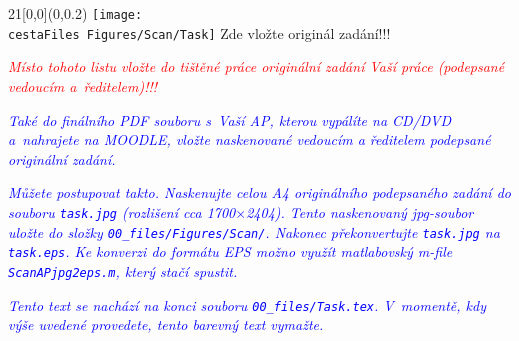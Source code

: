 ﻿\begin{textblock}{21}[0,0](0,0.2)
    \ifnum {}
        \texttt{[image: \\cestaFiles Figures/Scan/Task]}
    \else
        \vglue 13cm
        \hspace{5cm}
        {\huge Zde vložte originál zadání!!!}
    \fi
\end{textblock}

\textcolor{red}{\em Místo tohoto listu vložte do tištěné práce originální zadání Vaší práce (podepsané vedoucím a~ře\-di\-te\-lem)!!!\/}

\textcolor{blue}{\em Také do finálního PDF souboru s~Vaší AP, kterou vypálíte na CD/DVD a~nahrajete na MOODLE, vložte naskenované vedoucím a ředitelem podepsané originální zadání.\/}

\textcolor{blue}{\em Můžete postupovat takto. Naskenujte celou A4 originálního podepsaného zadání do souboru \texttt{task.jpg} (rozlišení cca 1700$\times$2404). Tento naskenovaný jpg-soubor uložte do složky \texttt{00\_files/Figures/Scan/}. Nakonec překonvertujte \texttt{task.jpg} na \texttt{task.eps}. Ke konverzi do formátu EPS možno využít matlabovský m-file \texttt{ScanAPjpg2eps.m}, který stačí spustit.\/}

\textcolor{blue}{\em Tento text se nachází na konci souboru \texttt{00\_files/Task.tex}. V~momentě, kdy výše uvedené provedete, tento barevný text vymažte.\/} 
